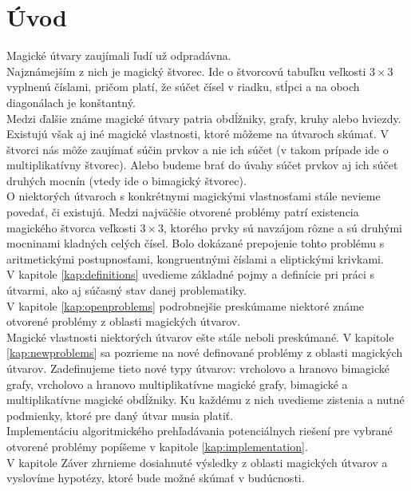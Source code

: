 \chapter*{Úvod} %

Magické útvary zaujímali ľudí už odpradávna. \\

Najznámejším z nich je magický štvorec. Ide o štvorcovú tabuľku veľkosti $3 \times 3$ vyplnenú číslami, pričom platí, že súčet čísel v riadku, stĺpci a na oboch diagonálach je konštantný. \\

Medzi ďalšie známe magické útvary patria obdĺžniky, grafy, kruhy alebo hviezdy. \\

Existujú však aj iné magické vlastnosti, ktoré môžeme na útvaroch skúmať. V štvorci nás môže zaujímať súčin prvkov a nie ich súčet (v takom prípade ide o multiplikatívny štvorec). Alebo budeme brať do úvahy súčet prvkov aj ich súčet druhých mocnín (vtedy ide o bimagický štvorec). \\

O niektorých útvaroch s konkrétnymi magickými vlastnosťami stále nevieme povedať, či existujú. Medzi najväčšie otvorené problémy patrí existencia magického štvorca veľkosti $3 \times 3$, ktorého prvky sú navzájom rôzne a sú druhými mocninami kladných celých čísel. Bolo dokázané prepojenie tohto problému s aritmetickými postupnosťami, kongruentnými číslami a eliptickými krivkami. \\

V kapitole \ref{kap:definitions} uvedieme základné pojmy a definície pri práci s útvarmi, ako aj súčasný stav danej problematiky. \\

V kapitole \ref{kap:openproblems} podrobnejšie preskúmame niektoré známe otvorené problémy z oblasti magických útvarov. \\

Magické vlastnosti niektorých útvarov ešte stále neboli preskúmané. V kapitole \ref{kap:newproblems} sa pozrieme na nové definované problémy z oblasti magických útvarov. Zadefinujeme tieto nové typy útvarov: vrcholovo a hranovo bimagické grafy, vrcholovo a hranovo multiplikatívne magické grafy, bimagické a multiplikatívne magické obdĺžniky. Ku každému z nich uvedieme zistenia a nutné podmienky, ktoré pre daný útvar musia platiť. \\

Implementáciu algoritmického prehľadávania potenciálnych riešení pre vybrané otvorené problémy popíšeme v kapitole \ref{kap:implementation}. \\

V kapitole Záver zhrnieme dosiahnuté výsledky z oblasti magických útvarov a vyslovíme hypotézy, ktoré bude možné skúmať v budúcnosti.
